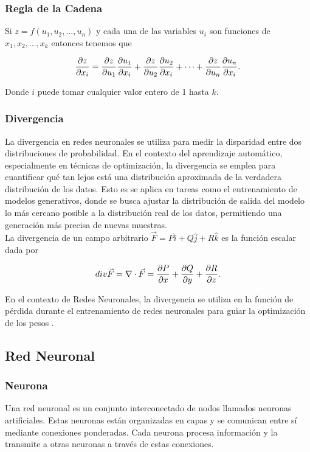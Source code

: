 \documentclass[titlepage,11pt]{article}
\begin{document}
	\subsubsection{Regla de la Cadena}
	
		Si $z=f(u_1,u_2,\ldots,u_n)$ y cada una de las variables $u_i$ son funciones de $x_1,x_2,\ldots,x_k$ entonces tenemos que \cite{zill_1985_clculo}
		
		$${\partial z\over\partial x_i}={\partial z\over\partial u_1}{\partial u_1\over\partial x_i}+{\partial z\over\partial u_2}{\partial u_2\over\partial x_i}+\cdots+{\partial z\over\partial u_n}{\partial u_n\over\partial x_i}.$$ 
		
		Donde $i$ puede tomar cualquier valor entero de 1 hasta $k$.
	
	\subsubsection{Divergencia}
		
		La divergencia en redes neuronales se utiliza para medir la disparidad entre dos distribuciones de probabilidad. En el contexto del aprendizaje automático, especialmente en técnicas de optimización, la divergencia se emplea para cuantificar qué tan lejos está una distribución aproximada de la verdadera distribución de los datos. Esto es se aplica en tareas como el entrenamiento de modelos generativos, donde se busca ajustar la distribución de salida del modelo lo más cercano posible a la distribución real de los datos, permitiendo una generación más precisa de nuevas muestras.\\
		
		La divergencia de un campo arbitrario $\vec{F}= P\hat{i}+Q\hat{j}+R\hat{k}$ es la función escalar dada por
		
		$$div \vec{F}=\nabla\cdot\vec{F}={\partial P\over\partial x}+{\partial Q\over\partial y}+{\partial R\over\partial z}.$$
		
		En el contexto de Redes Neuronales, la divergencia se utiliza en la función de pérdida durante el entrenamiento de redes neuronales para guiar la optimización de los pesos \cite{zill_1985_clculo}.


\subsection{Red Neuronal}
\label{subsec:redneuronal}

	\subsubsection{Neurona}
		Una red neuronal es un conjunto interconectado de nodos llamados neuronas artificiales. Estas neuronas están organizadas en capas y se comunican entre sí mediante conexiones ponderadas. Cada neurona procesa información y la transmite a otras neuronas a través de estas conexiones.
		
\end{document}
